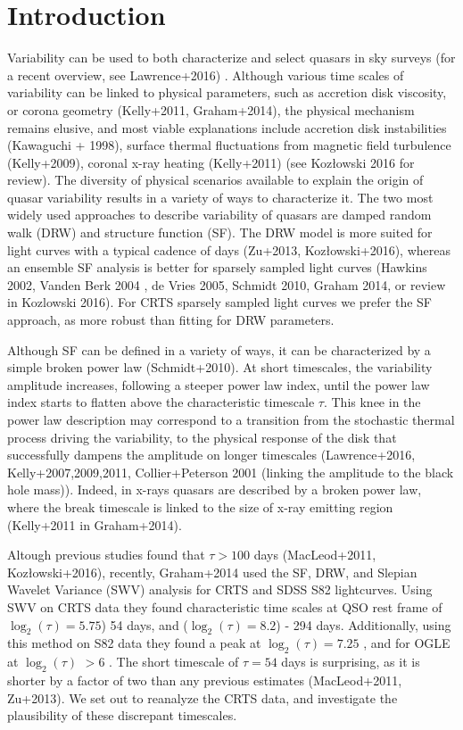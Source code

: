 \documentclass[fleqn,usenatbib]{mnras}  %
\begin{document}
\section{Introduction}
Variability can be used to both characterize and select quasars  in sky surveys (for a recent overview, see Lawrence+2016) . Although various time scales of variability can be linked to physical parameters, such as accretion disk viscosity, or corona geometry (Kelly+2011, Graham+2014), the physical mechanism remains elusive, and most viable explanations include accretion disk instabilities (Kawaguchi + 1998), surface thermal fluctuations from magnetic field turbulence (Kelly+2009), coronal x-ray heating (Kelly+2011) (see Koz\l{}owski 2016 for review).
The diversity of  physical scenarios available to explain the origin of quasar variability results in a variety of ways to characterize it. The two most widely used approaches to describe variability of quasars  are damped random walk (DRW) and structure function (SF). The DRW model is more suited for light curves with a typical cadence of days (Zu+2013, Koz\l{}owski+2016), whereas an ensemble SF analysis is better for sparsely sampled light curves (Hawkins 2002, Vanden Berk 2004 , de Vries 2005, Schmidt 2010, Graham 2014, or review in Kozlowski 2016). For CRTS sparsely sampled light curves we prefer the SF approach, as more robust  than fitting for DRW parameters.

Although SF can be defined  in a variety of ways, it can be characterized by a simple broken power law (Schmidt+2010). At short timescales,  the variability amplitude increases, following a steeper power law index,  until the power law index starts to flatten  above the characteristic timescale  $\tau$.   This knee in the power law  description may correspond to a transition from the stochastic thermal  process driving  the variability, to the physical response of the disk that successfully  dampens the amplitude on longer timescales (Lawrence+2016,  Kelly+2007,2009,2011, Collier+Peterson 2001 (linking the amplitude to the black hole mass)). Indeed,  in x-rays quasars are described by a broken  power law, where the  break timescale is linked to the size of x-ray emitting region (Kelly+2011 in Graham+2014). 

Altough previous studies found that  $\tau > 100$ days  (MacLeod+2011,  Koz\l{}owski+2016), recently, Graham+2014 used the SF, DRW, and Slepian Wavelet Variance (SWV) analysis for CRTS and SDSS S82 lightcurves. Using SWV on CRTS data they found characteristic time scales at   QSO rest frame of $\log_{2}(\tau) = 5.75$)  54 days,  and ($\log_{2}(\tau)=8.2$) -  294 days. Additionally, using this method on S82 data they found a peak at $\log_{2}(\tau) = 7.25$ , and for OGLE  at $\log_{2}(\tau)$ $> 6$ . The short timescale of   $\tau = 54$ days is surprising, as it is shorter by a factor of two than any previous estimates (MacLeod+2011, Zu+2013). We set out to reanalyze the CRTS data, and investigate the plausibility of these discrepant timescales. 
\end{document}
